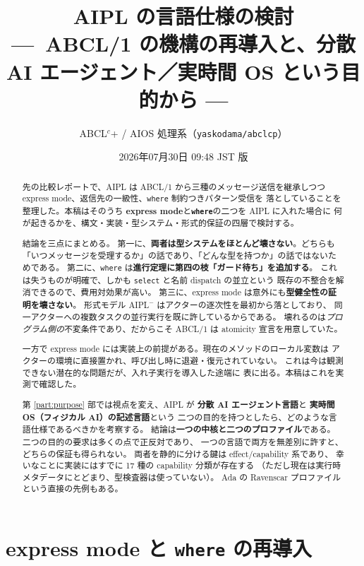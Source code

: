 \documentclass[11pt,a4paper]{ltjsarticle}
\title{AIPL の言語仕様の検討\\
{\large ---\ ABCL/1 の機構の再導入と、分散 AI エージェント／実時間 OS という目的から ---}}
\author{ABCL$^{c}$+ / AIOS 処理系（\texttt{yaskodama/abclcp}）}
\date{2026年07月30日 09:48 JST 版}
\theoremstyle{remark}
\begin{document}
\maketitle

\begin{abstract}
先の比較レポートで、AIPL は ABCL/1 から三種のメッセージ送信を継承しつつ
express mode、返信先の一級性、\texttt{where} 制約つきパターン受信を
落としていることを整理した。本稿はそのうち
\textbf{express mode}と\textbf{\texttt{where}}の二つを AIPL に入れた場合に
何が起きるかを、構文・実装・型システム・形式的保証の四層で検討する。

結論を三点にまとめる。
第一に、\textbf{両者は型システムをほとんど壊さない}。どちらも
「いつメッセージを受理するか」の話であり、「どんな型を持つか」の話ではないためである。
第二に、\texttt{where} は\textbf{進行定理に第四の枝「ガード待ち」を追加する}。
これは失うものが明確で、しかも \texttt{select} と名前 dispatch の並立という
既存の不整合を解消できるので、費用対効果が高い。
第三に、express mode は意外にも\textbf{型健全性の証明を壊さない}。
形式モデル AIPL$^-$ はアクターの逐次性を最初から落としており、
同一アクターへの複数タスクの並行実行を既に許しているからである。
壊れるのは\emph{プログラム側の}不変条件であり、だからこそ ABCL/1 は
atomicity 宣言を用意していた。

一方で express mode には実装上の前提がある。現在のメソッドのローカル変数は
アクターの環境に直接置かれ、呼び出し時に退避・復元されていない。
これは今は観測できない潜在的な問題だが、入れ子実行を導入した途端に
表に出る。本稿はこれを実測で確認した。

第 \ref{part:purpose} 部では視点を変え、AIPL が
\textbf{分散 AI エージェント言語}と
\textbf{実時間 OS（フィジカル AI）の記述言語}という
二つの目的を持つとしたら、どのような言語仕様であるべきかを考察する。
結論は\textbf{一つの中核と二つのプロファイル}である。
二つの目的の要求は多くの点で正反対であり、
一つの言語で両方を無差別に許すと、どちらの保証も得られない。
両者を静的に分ける鍵は effect/capability 系であり、
幸いなことに実装にはすでに 17 種の capability 分類が存在する
（ただし現在は実行時メタデータにとどまり、型検査器は使っていない）。
Ada の Ravenscar プロファイルという直接の先例もある。
\end{abstract}

\tableofcontents

\part{express mode と \texttt{where} の再導入}
\label{part:mech}
\end{document}

